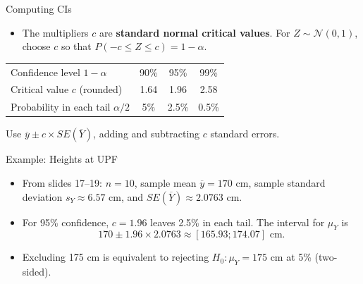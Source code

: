 \documentclass[notes,10pt, aspectratio=169]{beamer}
\begin{document}
\begin{frame}{Computing CIs}
\begin{itemize}
    \item The multipliers $c$ are \textbf{standard normal critical values}. For $Z\sim\mathcal{N}(0,1)$, choose $c$ so that $P(-c\leq Z\leq c)=1-\alpha$.
\end{itemize}
\begin{center}
\begin{tabular}{lccc}
\toprule
Confidence level $1-\alpha$ & 90\% & 95\% & 99\% \\
Critical value $c$ (rounded) & 1.64 & 1.96 & 2.58 \\
Probability in each tail $\alpha/2$ & 5\% & 2.5\% & 0.5\% \\
\bottomrule
\end{tabular}
\end{center}
Use $\overline{y}\pm c\times SE(\overline{Y})$, adding and subtracting $c$ standard errors.

\begin{block}{Example: Heights at UPF}
\begin{itemize}
    \item From slides 17--19: $n=10$, sample mean $\overline{y}=170$ cm, sample standard deviation $s_Y\approx6.57$ cm, and $SE(\overline{Y})\approx2.0763$ cm.
    \item For 95\% confidence, $c=1.96$ leaves 2.5\% in each tail. The interval for $\mu_Y$ is
    \begin{equation*}
        170 \pm 1.96 \times 2.0763 \approx [165.93 ; 174.07]\text{ cm}.
    \end{equation*}
    \item Excluding 175 cm is equivalent to rejecting $H_0:\mu_Y=175$ cm at 5\% (two-sided).
\end{itemize}
\end{block}
\end{frame}
\end{document}
